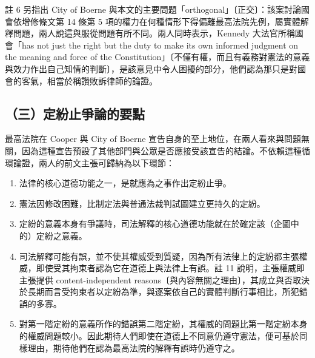 註 6 另指出 City of Boerne 與本文的主要問題「orthogonal」〔正交〕：該案討論國會依增修條文第 14 條第 5 項的權力在何種情形下得偏離最高法院先例，屬實體解釋問題，兩人說這與服從問題有所不同。兩人同時表示，Kennedy 大法官所稱國會「has not just the right but the duty to make its own informed judgment on the meaning and force of the Constitution」〔不僅有權，而且有義務對憲法的意義與效力作出自己知情的判斷〕，是該意見中令人困擾的部分，他們認為那只是對國會的客氣，相當於稱讚敗訴律師的論證。

\subsection{（三）定紛止爭論的要點}

最高法院在 Cooper 與 City of Boerne 宣告自身的至上地位，在兩人看來與問題無關，因為這種宣告預設了其他部門與公眾是否應接受該宣告的結論。不依賴這種循環論證，兩人的前文主張可歸納為以下環節：

\begin{enumerate}
\def\labelenumi{\arabic{enumi}.}
\tightlist
\item
  法律的核心道德功能之一，是就應為之事作出定紛止爭。
\item
  憲法因修改困難，比制定法與普通法裁判試圖建立更持久的定紛。
\item
  定紛的意義本身有爭議時，司法解釋的核心道德功能就在於確定該（企圖中的）定紛之意義。
\item
  司法解釋可能有誤，並不使其權威受到質疑，因為所有法律上的定紛都主張權威，即使受其拘束者認為它在道德上與法律上有誤。註 11 說明，主張權威即主張提供 content-independent reasons〔與內容無關之理由〕，其成立與否取決於長期而言受拘束者以定紛為準，與逐案依自己的實體判斷行事相比，所犯錯誤的多寡。
\item
  對第一階定紛的意義所作的錯誤第二階定紛，其權威的問題比第一階定紛本身的權威問題較小。因此期待人們即使在道德上不同意仍遵守憲法，便可基於同樣理由，期待他們在認為最高法院的解釋有誤時仍遵守之。
\end{enumerate}

